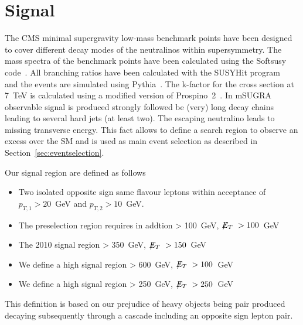\section{Signal}\label{sec:signal}

The CMS minimal supergravity low-mass benchmark points
have been designed to cover 
different decay modes of the neutralinos within supersymmetry. 
The mass spectra of the benchmark points have been calculated using the Softsusy code~\cite{softsusy}. 
All branching ratios have been calculated with the SUSYHit program~\cite{susyhit} 
and the events are simulated using Pythia~\cite{pythia}. 
The k-factor for the cross section at 7~TeV is calculated using a modified version of Prospino~2~\cite{prospino}. 
In mSUGRA observable signal is produced strongly followed be (very) long decay chains 
leading to several hard jets (at least two). 
The escaping neutralino leads to missing transverse energy. 
This fact allows to define a search region to observe an excess over the SM 
and is used as main event selection as described in Section~\ref{sec:eventselection}.

Our signal region are defined as follows
\begin{itemize}
\item Two isolated opposite sign same flavour leptons within acceptance of $p_{T,1}>20$~GeV and $p_{T,2}>10$~GeV.
\item The preselection region requires in addtion \HT > 100~GeV, $\displaystyle{\not} E_T~>100$~GeV
\item The 2010 signal region \HT > 350~GeV, $\displaystyle{\not} E_T~>150$~GeV
\item We define a high \HT signal region \HT > 600~GeV, $\displaystyle{\not} E_T~>100$~GeV
\item We define a high \MET signal region \HT > 250~GeV, $\displaystyle{\not} E_T~>250$~GeV
\end{itemize}

This definition is based on our prejudice of heavy objects
being pair produced decaying subsequently through a cascade
including an opposite sign lepton pair.


